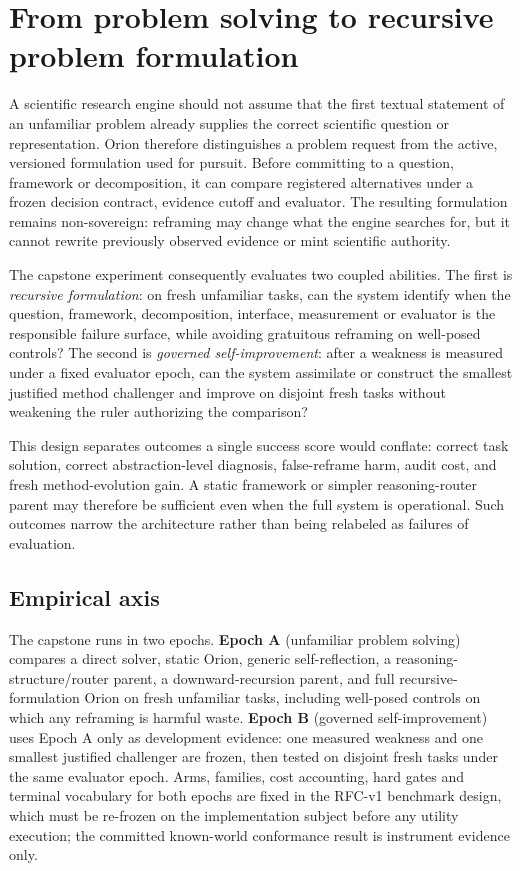 \section{From problem solving to recursive problem formulation}
\label{sec:recursive-problem-formulation}

A scientific research engine should not assume that the first textual statement of an unfamiliar
problem already supplies the correct scientific question or representation. Orion therefore
distinguishes a problem request from the active, versioned formulation used for pursuit. Before
committing to a question, framework or decomposition, it can compare registered alternatives under
a frozen decision contract, evidence cutoff and evaluator. The resulting formulation remains
non-sovereign: reframing may change what the engine searches for, but it cannot rewrite previously
observed evidence or mint scientific authority.

The capstone experiment consequently evaluates two coupled abilities. The first is
\emph{recursive formulation}: on fresh unfamiliar tasks, can the system identify when the question,
framework, decomposition, interface, measurement or evaluator is the responsible failure surface,
while avoiding gratuitous reframing on well-posed controls? The second is
\emph{governed self-improvement}: after a weakness is measured under a fixed evaluator epoch, can
the system assimilate or construct the smallest justified method challenger and improve on disjoint
fresh tasks without weakening the ruler authorizing the comparison?

This design separates outcomes a single success score would conflate: correct task solution,
correct abstraction-level diagnosis, false-reframe harm, audit cost, and fresh method-evolution
gain. A static framework or simpler reasoning-router parent may therefore be sufficient even when
the full system is operational. Such outcomes narrow the architecture rather than being relabeled
as failures of evaluation.

\subsection{Empirical axis}
\label{sec:recursive-formulation-epochs}

The capstone runs in two epochs. \textbf{Epoch A} (unfamiliar problem solving) compares a direct
solver, static Orion, generic self-reflection, a reasoning-structure/router parent, a
downward-recursion parent, and full recursive-formulation Orion on fresh unfamiliar tasks,
including well-posed controls on which any reframing is harmful waste. \textbf{Epoch B}
(governed self-improvement) uses Epoch A only as development evidence: one measured weakness and
one smallest justified challenger are frozen, then tested on disjoint fresh tasks under the same
evaluator epoch. Arms, families, cost accounting, hard gates and terminal vocabulary for both
epochs are fixed in the RFC-v1 benchmark design, which must be re-frozen on the implementation
subject before any utility execution; the committed known-world conformance result is instrument
evidence only.

